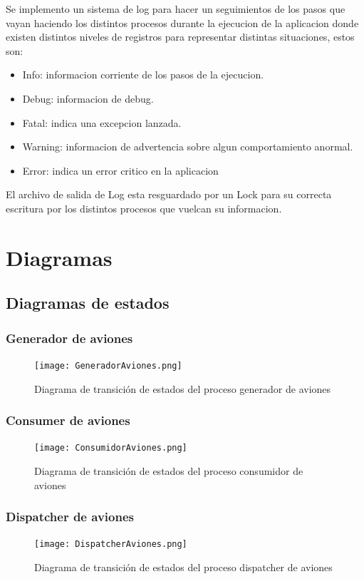 \documentclass[a4paper,12pt,titlepage]{article}
\begin{document}
Se implemento un sistema de log para hacer un seguimientos de los pasos que vayan haciendo los distintos procesos durante la ejecucion de la aplicacion donde existen distintos niveles de registros para representar distintas situaciones, estos son:
\begin{itemize}
\item Info: informacion corriente de los pasos de la ejecucion.
\item Debug: informacion de debug.
\item Fatal: indica una excepcion lanzada.
\item Warning: informacion de advertencia sobre algun comportamiento anormal.
\item Error: indica un error critico en la aplicacion
\end{itemize}
El archivo de salida de Log esta resguardado por un Lock para su correcta escritura por los distintos procesos que vuelcan su informacion.

\newpage
\section{Diagramas}
\subsection{Diagramas de estados}
\subsubsection{Generador de aviones}
\begin{figure}[h!]
\centering
\texttt{[image: GeneradorAviones.png]}
\caption{Diagrama de transición de estados del proceso generador de aviones}
\label{fig:estados_generador}
\end{figure}
\subsubsection{Consumer de aviones}
\begin{figure}[h!]
\centering
\texttt{[image: ConsumidorAviones.png]}
\caption{Diagrama de transición de estados del proceso consumidor de aviones}
\label{fig:estados_consumidor}
\end{figure}
\newpage
\subsubsection{Dispatcher de aviones}
\begin{figure}[h!]
\centering
\texttt{[image: DispatcherAviones.png]}
\caption{Diagrama de transición de estados del proceso dispatcher de aviones}
\label{fig:estados_dispatcher}
\end{figure}
\end{document}
